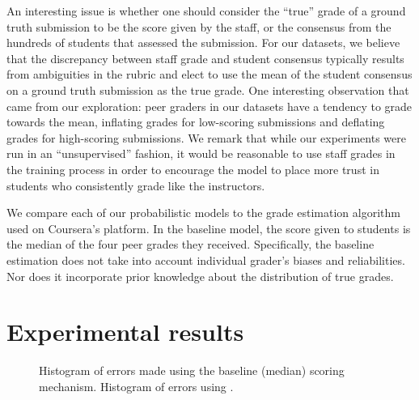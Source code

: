 An interesting issue is whether one should consider the ``true''
grade of a ground truth submission to be the score given by
the staff, or the consensus from the hundreds of students
that assessed the submission. For our datasets, we believe
that the discrepancy between staff grade and student consensus typically results from ambiguities in the rubric and
elect to use the mean of the student consensus on a ground
truth submission as the true grade. One interesting observation that came from our exploration: peer graders in our
datasets have a tendency to grade towards the mean, inflating
grades for low-scoring submissions and deflating grades for
high-scoring submissions. %
 We remark that
while our experiments were run in an ``unsupervised'' fashion, it would be reasonable to use staff grades
in the training process in order to encourage the model to
place more trust in students who consistently grade like the
instructors.

We compare each of our probabilistic models to the grade
estimation algorithm used on Coursera's platform. In the
baseline model, the score given to students is the median of
the four peer grades they received. Specifically, the baseline
estimation does not take into account individual grader's
biases and reliabilities. Nor does it incorporate prior knowledge about the distribution of true grades. 

\section{Experimental results}\label{sec:experiments}


\begin{figure}
\begin{center}
\end{center}
\caption[How the histogram of errors changes]{
 Histogram of errors made using the baseline (median) scoring mechanism. 
  Histogram of errors using \PGthree.  
 }
\label{tab:predacc}

\end{figure}

